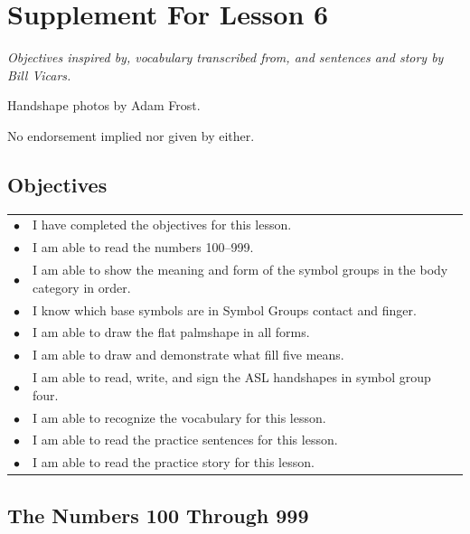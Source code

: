 \documentclass{article}
\begin{document}
\newfontfamily{}
\newfontfamily{}
\newcommand{\bul}{\hfil$\bullet$&}
\renewenvironment{glossary}{\begin{multicols}{5}\begin{center}}{\end{center}\end{multicols}}
\setcounter{secnumdepth}{0}
\setlength{\columnseprule}{1pt}

\section{Supplement For Lesson 6}

\begin{center}
\it
Objectives inspired by, vocabulary transcribed from, and sentences and story by Bill Vicars.

Handshape photos by Adam Frost.

No endorsement implied nor given by either.
\end{center}

\subsection{Objectives}

\begin{tabular}{p{1cm}p{14cm}}
\bul I have completed the objectives for this lesson.\\
\bul I am able to read the numbers 100--999.\\
\bul I am able to show the meaning and form of the symbol groups in the body category in order.\\
\bul I know which base symbols are in Symbol Groups contact and finger.\\
\bul I am able to draw the flat palmshape in all forms.\\
\bul I am able to draw and demonstrate what fill five means.\\
\bul I am able to read, write, and sign the ASL handshapes in symbol group four.\\
\bul I am able to recognize the vocabulary for this lesson.\\
\bul I am able to read the practice sentences for this lesson.\\
\bul I am able to read the practice story for this lesson.\\
\end{tabular}

\subsection{The Numbers 100 Through 999}
\end{document}
